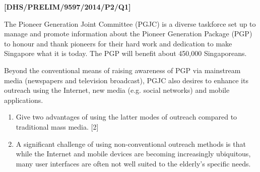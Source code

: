 \item \textbf{{[}DHS/PRELIM/9597/2014/P2/Q1{]} }

The Pioneer Generation Joint Committee (PGJC) is a diverse taskforce
set up to manage and promote information about the Pioneer Generation
Package (PGP) to honour and thank pioneers for their hard work and
dedication to make Singapore what it is today. The PGP will benefit
about 450,000 Singaporeans. 

Beyond the conventional means of raising awareness of PGP via mainstream
media (newspapers and television broadcast), PGJC also desires to
enhance its outreach using the Internet, new media (e.g. social networks)
and mobile applications. 
\begin{enumerate}
\item Give two advantages of using the latter modes of outreach compared
to traditional mass media. \hfill{}{[}2{]}
\item A significant challenge of using non-conventional outreach methods
is that while the Internet and mobile devices are becoming increasingly
ubiquitous, many user interfaces are often not well suited to the
elderly's specific needs. 


\end{enumerate}
